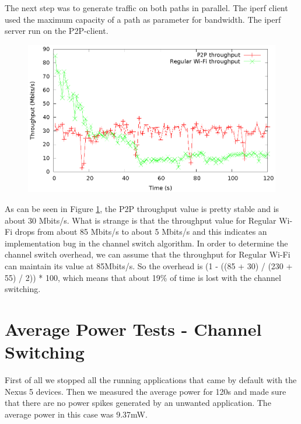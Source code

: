 The next step was to generate traffic on both paths in parallel. The iperf client used the maximum capacity of a path as parameter for bandwidth. The iperf server run on the P2P-client.

\begin{figure}[h!]
\includegraphics{src/img/throughpout.eps}
\label{img-thr}
\end{figure}

As can be seen in Figure \ref{img-thr}, the P2P throughput value is pretty stable and is about 30 Mbits/s. What is strange is that the throughput value for Regular Wi-Fi drops from about 85 Mbits/s to about 5 Mbits/s and this indicates an implementation bug in the channel switch algorithm. In order to determine the channel switch overhead, we can assume that the throughput for Regular Wi-Fi can maintain its value at 85Mbits/s. So the overhead is (1 - ((85 + 30) / (230 + 55) / 2)) * 100, which means that about 19\% of time is lost with the channel switching.

\newpage
\section{Average Power Tests - Channel Switching}
\label{sec:nexus5-consumption}

First of all we stopped all the running applications that came by default with the Nexus 5 devices. Then we measured the average power for 120s and made sure that there are no power spikes generated by an unwanted application. The average power in this case was 9.37mW.

